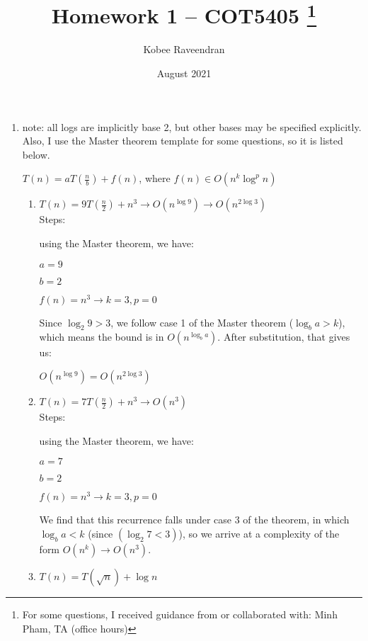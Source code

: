 \documentclass[12pt]{article}
\title{Homework 1 -- COT5405
    \thanks{For some questions, I received guidance from or collaborated with: Minh Pham, TA (office hours)}
}
\author{Kobee Raveendran}
\date{August 2021}
\begin{document}
\maketitle

\begin{enumerate}
    \item note: all logs are implicitly base 2, but other bases may be specified explicitly. Also, I use the Master theorem 
    template for some questions, so it is listed below.
    
    $T(n) = aT(\frac{n}{b}) + f(n)$, where $f(n) \in O(n^k\log^pn)$
    
    \begin{enumerate}
        \item $T(n) = 9T(\frac{n}{2})+n^3 \longrightarrow O(n^{\log9}) \longrightarrow O(n^{2\log3})$ \\
        
        Steps: 
        
        using the Master theorem, we have:
        
        $a = 9$
        
        $b = 2$
        
        $f(n) = n^3 \longrightarrow k = 3, p = 0$
        
        Since $\log_{2}9 > 3$, we follow case 1 of the Master theorem ($\log_{b}a > k$), which means the bound is in 
        $O(n^{\log_{b}a})$. After substitution, that gives us:
        
        $O(n^{\log9}) = O(n^{2\log3})$\\
        
        \item $T(n) = 7T(\frac{n}{2}) + n^3 \longrightarrow O(n^3)$ \\
        
        Steps:
        
        using the Master theorem, we have:
        
        $a = 7$
        
        $b = 2$
        
        $f(n) = n^3 \longrightarrow k = 3, p = 0$
        
        We find that this recurrence falls under case 3 of the theorem, in which $\log_{b}{a} < k$ 
        (since $(\log_{2}{7} < 3)$), so we arrive at a complexity of the form $O(n^k) \longrightarrow O(n^3)$.\\
        
        \item $T(n) = T(\sqrt{n}) + \log n$
        

\end{enumerate}
\end{enumerate}
\end{document}
